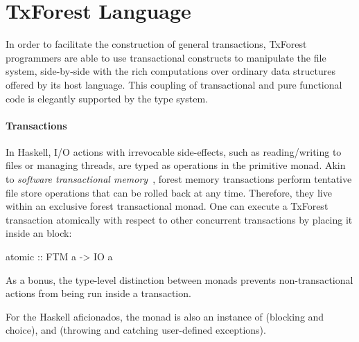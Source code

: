 
\section{TxForest Language}
\label{sec:txforest}

In order to facilitate the construction of general transactions, TxForest programmers are able to use transactional constructs to manipulate the file system, side-by-side with the rich computations over ordinary data structures offered by its host language.
This coupling of transactional and pure functional code is elegantly supported by the type system.

\paragraph{Transactions}
In Haskell, I/O actions with irrevocable side-effects, such as reading/writing to files or managing threads, are typed as operations in the primitive  monad.
Akin to \emph{software transactional memory}~\cite{HaskellSTM}, forest memory transactions perform tentative file store operations that can be rolled  back at any time. Therefore, they live within an exclusive  forest transactional monad.
One can execute a TxForest transaction atomically with respect to other concurrent transactions by placing it inside an  block:
\begin{code}
atomic :: FTM a -> IO a
\end{code}
As a bonus, the type-level distinction between monads prevents non-transactional actions from being run inside a transaction.

For the Haskell aficionados, the  monad is also an instance of  (blocking and choice),  and  (throwing and catching user-defined exceptions).

